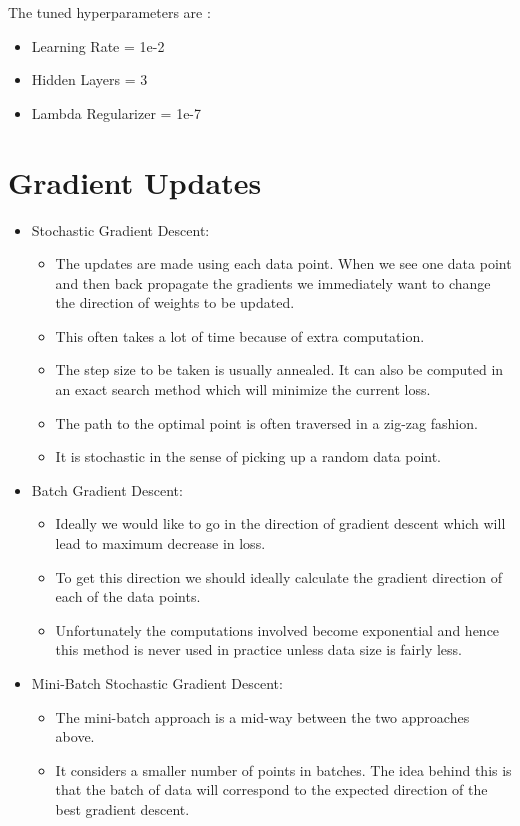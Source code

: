 \documentclass{article}
\begin{document}
The tuned hyperparameters are :
\begin{itemize}
\item Learning Rate = 1e-2
\item Hidden Layers = 3
\item Lambda Regularizer = 1e-7
\end{itemize}

\section{Gradient Updates}
\begin{itemize}
\item Stochastic Gradient Descent:
  \begin{itemize}
  \item The updates are made using each data point. When we see one data point and then back propagate the gradients we immediately want to change the direction of weights to be updated.
  \item This often takes a lot of time because of extra computation.
  \item The step size to be taken is usually annealed. It can also be computed in an exact search method which will minimize the current loss.
  \item The path to the optimal point is often traversed in a zig-zag fashion.
  \item It is stochastic in the sense of picking up a random data point.
  \end{itemize}
\item Batch Gradient Descent:
  \begin{itemize}
  \item Ideally we would like to go in the direction of gradient descent which will lead to maximum decrease in loss.
  \item To get this direction we should ideally calculate the gradient direction of each of the data points.
  \item Unfortunately the computations involved become exponential and hence this method is never used in practice unless data size is fairly less.
  \end{itemize}
\item Mini-Batch Stochastic Gradient Descent:
  \begin{itemize}
  \item The mini-batch approach is a mid-way between the two approaches above.
  \item It considers a smaller number of points in batches. The idea behind this is that the batch of data will correspond to the expected direction of the best gradient descent.

\end{itemize}
\end{itemize}
\end{document}
